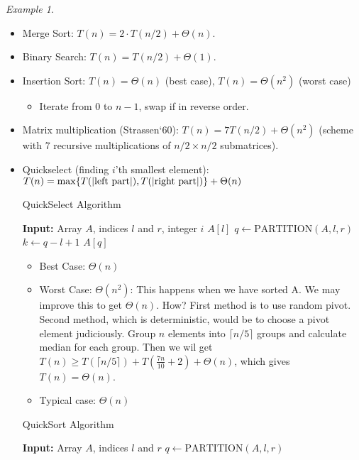 \documentclass{article}
\theoremstyle{remark}
\newtheorem{example}{Example}
\begin{document}
\begin{example}
\begin{itemize}
\item Merge Sort: $T(n) = 2\cdot T(n/2)+\Theta (n)$.
\item Binary Search: $T(n)=T(n/2)+\Theta(1)$.
\item Insertion Sort: $T(n)=\Theta(n)$ (best case), $T(n)=\Theta(n^2)$ (worst case)
    \begin{itemize}
    \item Iterate from $0$ to $n-1$, swap if in reverse order.
    \end{itemize}
\item Matrix multiplication (Strassen`60): $T(n)=7T(n/2)+\Theta(n^2)$ (scheme with 7 recursive multiplications of $n/2\times n/2$ submatrices).
\item Quickselect (finding $i$'th smallest element): $T(n)=\max\{T(\vert \text{left part}\vert),\\ T(\vert\text{right part}\vert)\}+\Theta(n)$

\begin{algorithm}
    \caption{QuickSelect Algorithm}
    \begin{algorithmic}[1] %
    \State \textbf{Input:} Array $A$, indices $l$ and $r$, integer $i$
            \State \Return $A[l]$
        \EndIf
        \State $q \gets \text{PARTITION}(A, l, r)$
        \State $k \gets q - l + 1$
            \State \Return $A[q]$
            \State \Return {}
        \Else
            \State \Return {}
        \EndIf
    \EndFunction
    \end{algorithmic}
\end{algorithm}
    \begin{itemize}
    \item Best Case: $\Theta(n)$
    \item Worst Case: $\Theta(n^2)$: This happens when we have sorted A. We may improve this to get $\Theta(n)$. How? First method is to use random pivot. 
    Second method, which is deterministic, would be to choose a pivot element judiciously. Group $n$ elements into $\lceil n/5 \rceil$ groups and calculate median for each group.  Then 
    we wil get $T(n)\geq T(\lceil n/5\rceil) + T(\frac {7n}{10}+2)+\Theta(n)$, which gives $T(n)=\Theta(n)$.
    \item Typical case: $\Theta(n)$
    \end{itemize}
\begin{algorithm}
    \caption{QuickSort Algorithm}
    \begin{algorithmic}[1]
    \State \textbf{Input:} Array \( A \), indices \( l \) and \( r \)
            \State $q \gets \text{PARTITION}(A, l, r)$
        \EndIf
    \EndFunction
    \end{algorithmic}
\end{algorithm}


\end{itemize}
\end{example}
\end{document}
